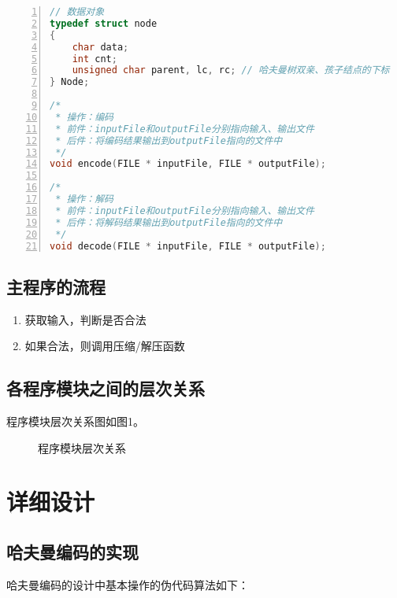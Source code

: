 \documentclass{article}
\begin{document}
\begin{lstlisting}[language={C},
    numbers=left,
    numberstyle=\tiny\consolas,
    basicstyle=\small\consolas]
// 数据对象
typedef struct node
{
    char data;
    int cnt;
    unsigned char parent, lc, rc; // 哈夫曼树双亲、孩子结点的下标
} Node;

/*
 * 操作：编码
 * 前件：inputFile和outputFile分别指向输入、输出文件
 * 后件：将编码结果输出到outputFile指向的文件中
 */
void encode(FILE * inputFile, FILE * outputFile);

/*
 * 操作：解码
 * 前件：inputFile和outputFile分别指向输入、输出文件
 * 后件：将解码结果输出到outputFile指向的文件中
 */
void decode(FILE * inputFile, FILE * outputFile);
\end{lstlisting}

\subsection{主程序的流程}

\begin{enumerate}
    \item 获取输入，判断是否合法
    \item 如果合法，则调用压缩/解压函数
\end{enumerate}

\subsection{各程序模块之间的层次关系}

程序模块层次关系图如图1。

\begin{figure}[htbp]


    \caption{程序模块层次关系}

\end{figure}

\section{详细设计}

\subsection{哈夫曼编码的实现}

哈夫曼编码的设计中基本操作的伪代码算法如下：

\begin{lstlisting}[language={C},
    numbers=left,
    numberstyle=\tiny\consolas,
    basicstyle=\small\consolas]
\end{lstlisting}
\end{document}
